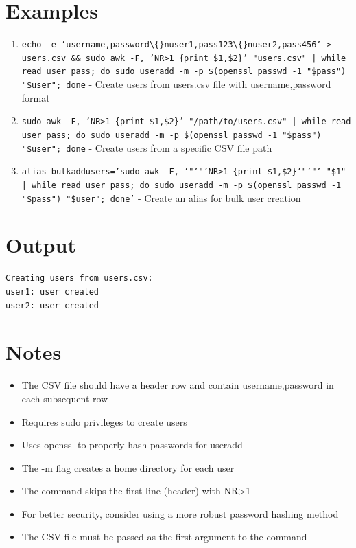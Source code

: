 \documentclass{article}
\begin{document}
\section*{Examples}
\begin{enumerate}
  \item \texttt{echo -e 'username,password\textbackslash\{\}nuser1,pass123\textbackslash\{\}nuser2,pass456' > users.csv \&\& sudo awk -F, 'NR>1 \{print \$1,\$2\}' "users.csv" | while read user pass; do sudo useradd -m -p \$(openssl passwd -1 "\$pass") "\$user"; done} - Create users from users.csv file with username,password format
  \item \texttt{sudo awk -F, 'NR>1 \{print \$1,\$2\}' "/path/to/users.csv" | while read user pass; do sudo useradd -m -p \$(openssl passwd -1 "\$pass") "\$user"; done} - Create users from a specific CSV file path
  \item \texttt{alias bulkaddusers='sudo awk -F, '"'"'NR>1 \{print \$1,\$2\}'"'"' "\$1" | while read user pass; do sudo useradd -m -p \$(openssl passwd -1 "\$pass") "\$user"; done'} - Create an alias for bulk user creation
\end{enumerate}

\section*{Output}
\begin{lstlisting}
Creating users from users.csv:
user1: user created
user2: user created
\end{lstlisting}

\section*{Notes}
\begin{itemize}
  \item The CSV file should have a header row and contain username,password in each subsequent row
  \item Requires sudo privileges to create users
  \item Uses openssl to properly hash passwords for useradd
  \item The -m flag creates a home directory for each user
  \item The command skips the first line (header) with NR>1
  \item For better security, consider using a more robust password hashing method
  \item The CSV file must be passed as the first argument to the command
\end{itemize}
\end{document}
